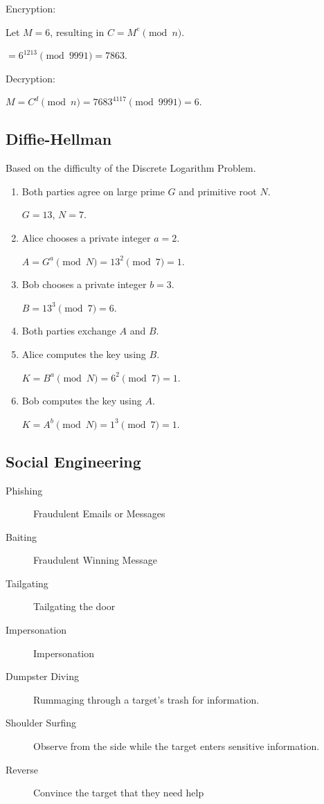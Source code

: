 \documentclass[11pt,journal,compsoc]{IEEEtran}
\begin{document}
Encryption:

Let $M = 6$, resulting in $C = M^e \pmod{n}$.

$= 6^{1213} \pmod{9991} = 7863$.

Decryption:

$M = C^d \pmod{n} = 7683^{4117} \pmod{9991} = 6$.

\subsection{Diffie-Hellman}

Based on the difficulty of the Discrete Logarithm Problem.

\begin{enumerate}
    \item Both parties agree on large prime $G$ and primitive root $N$.
    
    $G = 13$, $N = 7$.
    
    \item Alice chooses a private integer $a = 2$.
    
    $A = G^a \pmod{N} = 13^2 \pmod{7} = 1$.
    
    \item Bob chooses a private integer $b = 3$.
    
    $B = 13^3 \pmod{7} = 6$.
    
    \item Both parties exchange $A$ and $B$.
    
    \item Alice computes the key using $B$.
    
    $K = B^a \pmod{N} = 6^2 \pmod{7} = 1$.
    
    \item Bob computes the key using $A$.
    
    $K = A^b \pmod{N} = 1^3 \pmod{7} = 1$.
\end{enumerate}

\subsection{Social Engineering}


\begin{description}
    \item[Phishing] Fraudulent Emails or Messages

    \item[Baiting] Fraudulent Winning Message

    \item[Tailgating] Tailgating the door

    \item[Impersonation] Impersonation

    \item[Dumpster Diving] Rummaging through a target's trash for information.

    \item[Shoulder Surfing] Observe from the side while the target enters sensitive information.

    \item[Reverse] Convince the target that they need help
\end{description}
\end{document}
